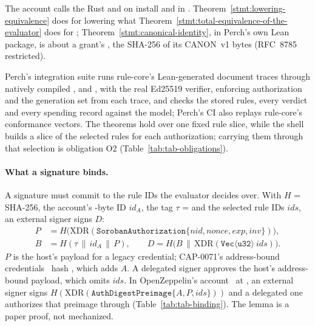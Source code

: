The account calls the Rust  and  on install and
\allowbreak{} in .
Theorem~\ref{stmt:lowering-equivalence} does for lowering what
Theorem~\ref{stmt:total-equivalence-of-the-evaluator} does for ;
Theorem~\ref{stmt:canonical-identity}, in Perch's own Lean package, is about a
grant's , the SHA-256 of its CANON~v1 bytes (RFC~8785~\cite{rfc8785}
restricted).




\noindent Perch's
integration suite runs rule-core's  Lean-generated document
traces through natively compiled ,  and
, with the real Ed25519 verifier, enforcing authorization and
the generation set from each trace, and checks the stored rules, every verdict
and every spending record against the model; Perch's CI also replays rule-core's
conformance vectors. The theorems hold over one fixed rule slice, while the shell
builds a slice of the selected rules for each authorization; carrying them
through that selection is obligation O2 (Table~\ref{tab:tab-obligations}).




\paragraph{What a signature binds.} A signature must commit to the rule IDs the
evaluator decides over. With $H$ = SHA-256, the account's
-byte ID $\mathit{id}_A$, the tag $\tau$ =
 and the selected rule IDs $\mathit{ids}$, an external
signer signs $D$:
\begin{align*}
  P &= H\bigl(\mathrm{XDR}(\mathtt{SorobanAuthorization}\{\mathit{nid}, \mathit{nonce}, \mathit{exp}, \mathit{inv}\})\bigr),\\
  B &= H(\tau \,\|\, \mathit{id}_A \,\|\, P), \qquad
  D = H\bigl(B \,\|\, \mathrm{XDR}(\mathtt{Vec}\langle\mathtt{u32}\rangle\ \mathit{ids})\bigr).
\end{align*}
$P$ is the host's payload for a legacy  credential; CAP-0071's
address-bound credentials~\cite{cap-0071} hash , which adds $A$. A
delegated signer approves the host's address-bound payload, which omits
$\mathit{ids}$. In OpenZeppelin's account~\cite{oz-stellar-accounts} at , an
external signer signs $H(\mathrm{XDR}(\mathtt{AuthDigestPreimage}\{A, P,
\mathit{ids}\}))$ and a delegated one authorizes that preimage through 
(Table~\ref{tab:tab-binding}). The lemma is a paper proof, not mechanized.

